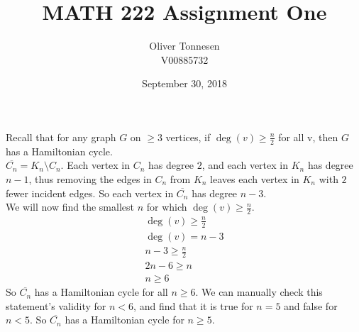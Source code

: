 \documentclass{article}
\title{MATH 222 Assignment One}
\author{Oliver Tonnesen\\V00885732}
\date{September 30, 2018}
\begin{document}
\maketitle
\renewcommand{\thesubsection}{\thesection.\alph{subsection}}
\section{} %
\subsection{}
	Recall that for any graph $G$ on $\ge3$ vertices, if $\deg(v)\ge\frac{n}{2}$ for all v, then $G$ has a Hamiltonian cycle.\\
	$\overline{C_n}=K_n\setminus{C_n}$. Each vertex in $C_n$ has degree $2$, and each vertex in $K_n$ has degree $n-1$, thus removing the
	edges in $C_n$ from $K_n$ leaves each vertex in $K_n$ with $2$ fewer incident edges. So each vertex in $\overline{C_n}$ has degree $n-3$.\\
	We will now find the smallest $n$ for which $\deg(v)\ge\frac{n}{2}$.
	\begin{align*}
		\deg(v)\ge\frac{n}{2}\\
		\deg(v)=n-3\\
		n-3\ge\frac{n}{2}\\
		2n-6\ge{n}\\
		n\ge6
	\end{align*}
	So $\overline{C_n}$ has a Hamiltonian cycle for all $n\ge6$. We can manually check this statement's validity for $n<6$, and find that
	it is true for $n=5$ and false for $n<5$. So $\overline{C_n}$ has a Hamiltonian cycle for $n\ge5$.
\end{document}
